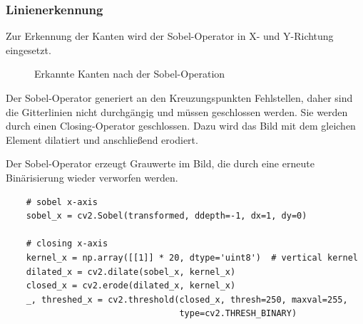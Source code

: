 \subsubsection{Linienerkennung}
Zur Erkennung der Kanten wird der Sobel-Operator in X- und Y-Richtung eingesetzt.

\begin{figure}[H]
    \hfill
    \caption{Erkannte Kanten nach der Sobel-Operation}
\end{figure}

Der Sobel-Operator generiert an den Kreuzungspunkten Fehlstellen, daher sind die Gitterlinien nicht durchgängig und müssen geschlossen werden.
Sie werden durch einen Closing-Operator geschlossen.
Dazu wird das Bild mit dem gleichen Element dilatiert und anschließend erodiert.

Der Sobel-Operator erzeugt Grauwerte im Bild, die durch eine erneute Binärisierung wieder verworfen werden.

\begin{lstlisting}
    # sobel x-axis
    sobel_x = cv2.Sobel(transformed, ddepth=-1, dx=1, dy=0)

    # closing x-axis
    kernel_x = np.array([[1]] * 20, dtype='uint8')  # vertical kernel
    dilated_x = cv2.dilate(sobel_x, kernel_x)
    closed_x = cv2.erode(dilated_x, kernel_x)
    _, threshed_x = cv2.threshold(closed_x, thresh=250, maxval=255,
                                  type=cv2.THRESH_BINARY)
\end{lstlisting}

